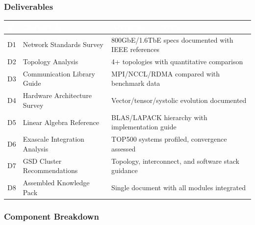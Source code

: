 \documentclass[11pt,letterpaper]{article}
\newcommand{\tableheader}[1]{\textbf{\sffamily\textcolor{white}{#1}}}
\begin{document}
\subsubsection{Deliverables}

\begin{center}
\begin{tabularx}{\textwidth}{C{0.5cm}L{3.5cm}X}
\toprule
{}
\tableheader{\#} & \tableheader{Deliverable} & \tableheader{Acceptance Criteria} \\
\midrule
D1 & Network Standards Survey & 800GbE/1.6TbE specs documented with IEEE references \\
D2 & Topology Analysis & 4+ topologies with quantitative comparison \\
D3 & Communication Library Guide & MPI/NCCL/RDMA compared with benchmark data \\
D4 & Hardware Architecture Survey & Vector/tensor/systolic evolution documented \\
D5 & Linear Algebra Reference & BLAS/LAPACK hierarchy with implementation guide \\
D6 & Exascale Integration Analysis & TOP500 systems profiled, convergence assessed \\
D7 & GSD Cluster Recommendations & Topology, interconnect, and software stack guidance \\
D8 & Assembled Knowledge Pack & Single document with all modules integrated \\
\bottomrule
\end{tabularx}
\end{center}

\subsubsection{Component Breakdown}
\end{document}
